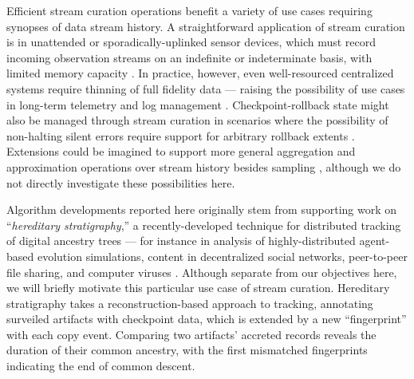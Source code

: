 Efficient stream curation operations benefit a variety of use cases requiring synopses of data stream history.
A straightforward application of stream curation is in unattended or sporadically-uplinked sensor devices, which must record incoming observation streams on an indefinite or indeterminate basis, with limited memory capacity \citep{jain2022survey}.
In practice, however, even well-resourced centralized systems require thinning of full fidelity data --- raising the possibility of use cases in long-term telemetry and log management \citep{kent2006guide,miebach2002hubble}.
Checkpoint-rollback state might also be managed through stream curation in scenarios where the possibility of non-halting silent errors require support for arbitrary rollback extents \citep{aupy2013combination}.
Extensions could be imagined to support more general aggregation and approximation operations over stream history besides sampling \citep{schoellhammer2024lightweight}, although we do not directly investigate these possibilities here.


Algorithm developments reported here originally stem from supporting work on ``\textit{hereditary stratigraphy},'' a recently-developed technique for distributed tracking of digital ancestry trees --- for instance in analysis of highly-distributed agent-based evolution simulations, content in decentralized social networks, peer-to-peer file sharing, and computer viruses \citep{moreno2022hereditary}.
Although separate from our objectives here, we will briefly motivate this particular use case of stream curation.
Hereditary stratigraphy takes a reconstruction-based approach to tracking, annotating surveiled artifacts with checkpoint data, which is extended by a new ``fingerprint'' with each copy event.
Comparing two artifacts' accreted records reveals the duration of their common ancestry, with the first mismatched fingerprints indicating the end of common descent.


